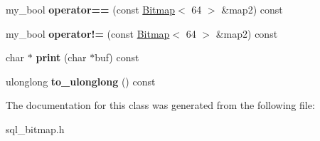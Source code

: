 \begin{DoxyCompactItemize}
\item 
\mbox{\label{classBitmap_3_0164_01_4_a78999b74d2fd426ab624bfdaebb38c9d}} 
my\+\_\+bool {\bfseries operator==} (const \mbox{\hyperlink{classBitmap}{Bitmap}}$<$ 64 $>$ \&map2) const
\item 
\mbox{\label{classBitmap_3_0164_01_4_a63f12457e12618f2ae72e89e799fe439}} 
my\+\_\+bool {\bfseries operator!=} (const \mbox{\hyperlink{classBitmap}{Bitmap}}$<$ 64 $>$ \&map2) const
\item 
\mbox{\label{classBitmap_3_0164_01_4_a21d621cbac20a5c03cf92246cafc73aa}} 
char $\ast$ {\bfseries print} (char $\ast$buf) const
\item 
\mbox{\label{classBitmap_3_0164_01_4_a5a006c31f228b0cadc56cd41d765d70a}} 
ulonglong {\bfseries to\+\_\+ulonglong} () const
\end{DoxyCompactItemize}


The documentation for this class was generated from the following file\+:\begin{DoxyCompactItemize}
\item 
sql\+\_\+bitmap.\+h\end{DoxyCompactItemize}

